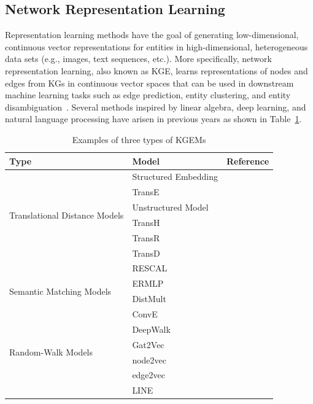 \subsection{Network Representation Learning}
\label{subsec:nrl}

Representation learning methods have the goal of generating low-dimensional, continuous vector representations for entities in high-dimensional, heterogeneous data sets (e.g., images, text sequences, etc.).
More specifically, network representation learning, also known as \ac{KGE}, learns representations of nodes and edges from \ac{KG}s in continuous vector spaces that can be used in downstream machine learning tasks such as edge prediction, entity clustering, and entity disambiguation~\cite{Wang2017}.
Several methods inspired by linear algebra, deep learning, and natural language processing have arisen in previous years as shown in Table~\ref{tab:kgem_examples}.

\begin{table}
    \centering
    \caption{Examples of three types of \ac{KGEM}s}\label{tab:kgem_examples}
    \begin{tabular}{ l l l }
        \hline
        Type & Model & Reference \\
        \hline
        \multirow{6}{*}{Translational Distance Models}
        & Structured Embedding & ~\cite{Bordes2011}  \\
        & TransE & ~\cite{Bordes2013} \\
        & Unstructured Model & ~\cite{Bordes2014} \\
        & TransH & ~\cite{Wang2014} \\
        & TransR & ~\cite{Lin2015} \\
        & TransD & ~\cite{Ji2015} \\
        \hline
        \multirow{4}{*}{Semantic Matching Models}
        & RESCAL & ~\cite{Nickel2011} \\
        & ERMLP & ~\cite{Dong2014} \\
        & DistMult & ~\cite{Yang2014}  \\
        & ConvE & ~\cite{Dettmers2017} \\
        \hline
        \multirow{4}{*}{Random-Walk Models}
        & DeepWalk & ~\cite{Perozzi2014} \\
        & Gat2Vec & ~\cite{Sheikh2018} \\
        & node2vec & ~\cite{Grover2016} \\
        & edge2vec & ~\cite{Gao2018} \\
        & LINE & ~\cite{Tang2015} \\
        \hline
    \end{tabular}
\end{table}

